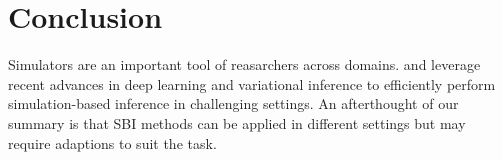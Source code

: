 \documentclass[12pt]{article}
\begin{document}
\section*{Conclusion}
Simulators are an important tool of reasarchers across domains. \citet{papamakarios2016fast} and \citet{lueckmann2017flexible} leverage recent advances in deep learning and variational inference to efficiently perform simulation-based inference in challenging settings. An afterthought of our summary is that SBI methods can be applied in different settings but may require adaptions to suit the task.


%





\end{document}
